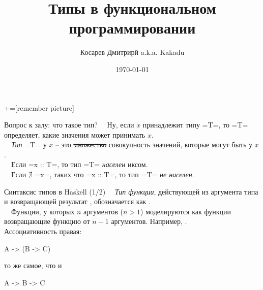 \documentclass{beamer}
\title[Занятие 1: типы]{Типы в функциональном программировании}
\author{Косарев Дмитрирй a.k.a. Kakadu}
\institute{матмех СПбГУ}
\date{\today}
\begin{document}
\maketitle

+=[remember picture]

\everymath{\displaystyle}


\begin{frame}[fragile]{Вопрос к залу: что такое тип?}
\pause
~\ Ну, если $x$ принадлежит типу \inline=T=, то \inline=T= определяет, какие значения может принимать $x$.
\\ \vspace{0.5cm} %
~\ \emph{Тип} \inline=T= у $x$ -- это \sout{множество} совокупность значений, которые могут быть у $x$.
\vspace{0.5cm} \\ %
~\  Если \inline=x :: T=, то тип \inline=T= \emph{населен} иксом.
\\ \vspace{0.5cm} %
~\ Если $\nexists$ \inline=x=, таких что \inline=x :: T=, то тип \inline=T= \emph{не населен}.
\end{frame}

\begin{frame}[fragile]{Синтаксис типов в Haskell (1/2)}
~\ \emph{Тип функции}, действующей из аргумента типа  и возвращающей результат , обозначается как .
\\ \pause
~\ Функции, у которых $n$ аргументов ($n>1$) моделируются как функции возвращающие функцию от $n-1$ аргументов. Например, . \\
\pause 
\vspace{1cm}
Ассоциативность правая:
\begin{hslisting}
A -> (B -> C) 
\end{hslisting}
то же самое, что и
\begin{hslisting}
A -> B -> C
\end{hslisting}
\end{frame}
\end{document}
